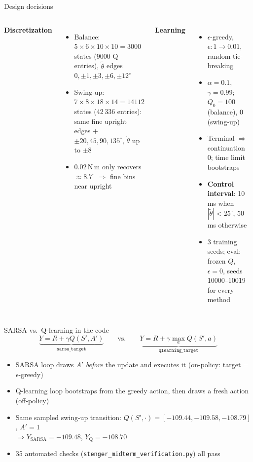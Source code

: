 \documentclass[aspectratio=169,10pt]{beamer}
\newcommand{\thw}{\tilde\theta}
\begin{document}
\begin{frame}{Design decisions}
\begin{columns}[T]
\textbf{Discretization}
\begin{itemize}
\item Balance: $5\times6\times10\times10=3000$ states (9000 Q entries), $\thw$ edges $0,\pm1,\pm3,\pm6,\pm12^\circ$
\item Swing-up: $7\times8\times18\times14=14112$ states (42\,336 entries): same fine upright edges + $\pm20,45,90,135^\circ$, $\dot\theta$ up to $\pm8$
\item $0.02$\,N\,m only recovers $\approx8.7^\circ$ $\Rightarrow$ fine bins near upright
\end{itemize}
\textbf{Learning}
\begin{itemize}
\item $\epsilon$-greedy, $\epsilon:1\to0.01$, random tie-breaking
\item $\alpha=0.1$, $\gamma=0.99$; $Q_0=100$ (balance), $0$ (swing-up)
\item Terminal $\Rightarrow$ continuation 0; time limit bootstraps
\item \textbf{Control interval}: 10\,ms when $|\thw|<25^\circ$, 50\,ms otherwise
\item 3 training seeds; eval: frozen $Q$, $\epsilon=0$, seeds 10000--10019 for every method
\end{itemize}
\end{columns}
\end{frame}

\begin{frame}{SARSA vs.\ Q-learning in the code}
\[
\underbrace{Y=R+\gamma Q(S',A')}_{\texttt{sarsa\_target}}\qquad\text{vs.}\qquad
\underbrace{Y=R+\gamma\max_a Q(S',a)}_{\texttt{qlearning\_target}}
\]
\begin{itemize}
\item SARSA loop draws $A'$ \emph{before} the update and executes it (on-policy: target = $\epsilon$-greedy)
\item Q-learning loop bootstraps from the greedy action, then draws a fresh action (off-policy)
\item Same sampled swing-up transition: $Q(S',\cdot)=[-109.44,-109.58,-108.79]$, $A'=1$\\
$\Rightarrow Y_{\text{SARSA}}=-109.48$, \quad $Y_{\text{Q}}=-108.70$
\item 35 automated checks (\texttt{stenger\_midterm\_verification.py}) all pass
\end{itemize}
\end{frame}
\end{document}
